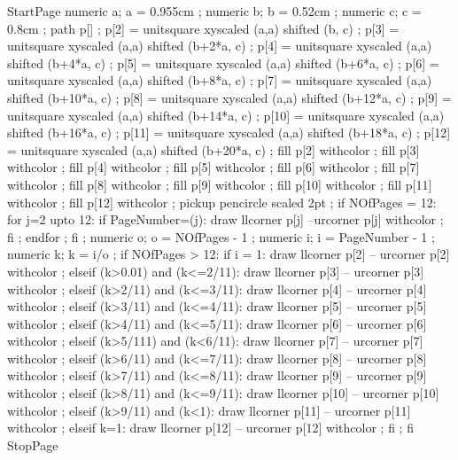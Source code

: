 \startmode[squaremode]
StartPage
numeric a; a = 0.955cm ;
numeric b; b = 0.52cm ;
numeric c; c = 0.8cm ;
path p[] ;
p[2] = unitsquare xyscaled (a,a) shifted (b, c) ;
p[3] = unitsquare xyscaled (a,a) shifted (b+2*a, c) ;
p[4] = unitsquare xyscaled (a,a) shifted (b+4*a, c) ;
p[5] = unitsquare xyscaled (a,a) shifted (b+6*a, c) ;
p[6] = unitsquare xyscaled (a,a) shifted (b+8*a, c) ;
p[7] = unitsquare xyscaled (a,a) shifted (b+10*a, c) ;
p[8] = unitsquare xyscaled (a,a) shifted (b+12*a, c) ;
p[9] = unitsquare xyscaled (a,a) shifted (b+14*a, c) ;
p[10] = unitsquare xyscaled (a,a) shifted (b+16*a, c) ;
p[11] = unitsquare xyscaled (a,a) shifted (b+18*a, c) ;
p[12] = unitsquare xyscaled (a,a) shifted (b+20*a, c) ;
fill p[2] withcolor  ;
fill p[3] withcolor  ;
fill p[4] withcolor  ;
fill p[5] withcolor  ;
fill p[6] withcolor  ;
fill p[7] withcolor  ;
fill p[8] withcolor  ;
fill p[9] withcolor  ;
fill p[10] withcolor  ;
fill p[11] withcolor  ;
fill p[12] withcolor  ;
pickup pencircle scaled 2pt ;
if NOfPages = 12:
	for j=2 upto 12:
		if PageNumber=(j):
		draw llcorner p[j] --urcorner p[j] withcolor  ;
		fi ;
	endfor ;
fi ;
numeric o; o = NOfPages - 1 ;
numeric i; i = PageNumber - 1 ;
numeric k; k = i/o ;
if NOfPages > 12:
	if i = 1:
		draw llcorner p[2] -- urcorner p[2] withcolor  ;
	elseif (k>0.01) and (k<=2/11):
		draw llcorner p[3] -- urcorner p[3] withcolor  ;
	elseif (k>2/11) and (k<=3/11):
		draw llcorner p[4] -- urcorner p[4] withcolor  ;
	elseif (k>3/11) and (k<=4/11):
		draw llcorner p[5] -- urcorner p[5] withcolor  ;
	elseif (k>4/11) and (k<=5/11):
		draw llcorner p[6] -- urcorner p[6] withcolor  ;
	elseif (k>5/111) and (k<6/11):
		draw llcorner p[7] -- urcorner p[7] withcolor  ;
	elseif (k>6/11) and (k<=7/11):
		draw llcorner p[8] -- urcorner p[8] withcolor  ;
	elseif (k>7/11) and (k<=8/11):
		draw llcorner p[9] -- urcorner p[9] withcolor  ;
	elseif (k>8/11) and (k<=9/11):
		draw llcorner p[10] -- urcorner p[10] withcolor  ;
	elseif (k>9/11) and (k<1):
		draw llcorner p[11] -- urcorner p[11] withcolor  ;
	elseif k=1:
		draw llcorner p[12] -- urcorner p[12] withcolor  ;
	fi ;
fi
StopPage
\stopuseMPgraphic 
\stopmode

